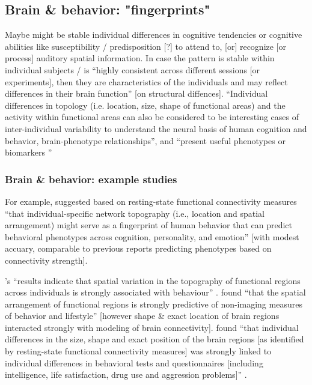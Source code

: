 \subsection{Brain \& behavior: "fingerprints"}

%
Maybe might be stable individual differences in cognitive tendencies or
cognitive abilities like susceptibility / predisposition [?] to attend to, [or]
recognize [or process] auditory spatial information.
In case the pattern is stable within individual subjects / is ``highly
consistent across different sessions [or experiments], then they are
characteristics of the individuals and may reflect differences in their brain
function'' \citep{kanai2011structural} [on structural diffences].
%
``Individual differences in topology (i.e. location, size, shape of functional
areas) and the activity within functional areas can also be considered to be
interesting cases of inter-individual variability to understand the neural basis
of human cognition and behavior, brain-phenotype relationships'', and ``present
useful phenotypes or biomarkers \citep{glasser2016multi,
vanhorn2008individual}''


\subsubsection{Brain \& behavior: example studies}


%
For example, \citet{kong2019spatial} suggested based on resting-state functional
connectivity measures ``that individual-specific network topography (i.e.,
location and spatial arrangement) might serve as a fingerprint of human behavior
that can predict behavioral phenotypes across cognition, personality, and
emotion'' \citep{kong2019spatial} [with modest accuary, comparable to previous
reports predicting phenotypes based on connectivity strength].

%
\citep{bijsterbosch2018relationship}'s ``results indicate that spatial variation
in the topography of functional regions across individuals is strongly
associated with behaviour'' \citep{bijsterbosch2018relationship}.
%
\citet{bijsterbosch2018relationship} found ``that the spatial arrangement of
functional regions is strongly predictive of non-imaging measures of behavior
and lifestyle'' [however shape \& exact location of brain regions interacted
strongly with  modeling of brain connectivity].
%
\citet{bijsterbosch2018relationship} found ``that individual differences in the
size, shape and exact position of the brain regions [as identified by
resting-state functional connectivity measures] was strongly linked to
individual differences in behavioral tests and questionnaires [including
intelligence, life satisfaction, drug use and aggression problems]''
\citep{bijsterbosch2018relationship}.

